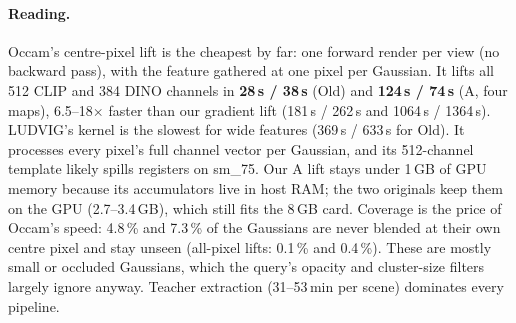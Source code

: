 \paragraph{Reading.} Occam's centre-pixel lift is the cheapest by far: one forward render per view (no backward
pass), with the feature gathered at one pixel per Gaussian. It lifts all 512 CLIP and 384 DINO channels in
\textbf{28\,s / 38\,s} (Old) and \textbf{124\,s / 74\,s} (A, four maps), 6.5--18$\times$ faster than our
gradient lift (181\,s / 262\,s and 1064\,s / 1364\,s). LUDVIG's kernel is the slowest for wide features (369\,s / 633\,s
for Old). It processes every pixel's full channel vector per Gaussian, and its 512-channel template
likely spills registers on sm\_75. Our A lift stays under 1\,GB of GPU memory because its accumulators live in host RAM; the two originals keep
them on the GPU (2.7--3.4\,GB), which still fits the 8\,GB card. Coverage is the price of Occam's speed: 4.8\,\% and
7.3\,\% of the Gaussians are never blended at their own centre pixel and stay unseen (all-pixel lifts: 0.1\,\% and
0.4\,\%). These are mostly small or occluded Gaussians, which the query's opacity and cluster-size filters largely
ignore anyway. Teacher extraction (31--53\,min per scene) dominates every pipeline.
